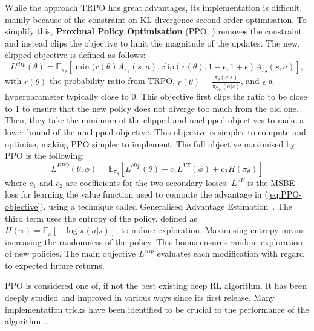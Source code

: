 While the approach TRPO has great advantages, its implementation is difficult, mainly because of the constraint on KL divergence second-order optimisation. To simplify this, \textbf{Proximal Policy Optimisation} (PPO; \cite{Schulman2017_PPO}) removes the constraint and instead clips the objective to limit the magnitude of the updates. The new, clipped objective is defined as follows:
\begin{equation}
    L^{clip}(\theta)=\mathbb{E}_{\pi_\theta}\left[\min(r(\theta)A_{\pi_\theta}(s,a),\text{clip}(r(\theta),1-\epsilon,1+\epsilon)A_{\pi_\theta}(s,a)\right],
    \label{eq:PPO-objective}
\end{equation}
with $r(\theta)$ the probability ratio from TRPO, $r(\theta)=\frac{\pi_\theta(a|s)}{\pi_{\theta_{old}}(a|s)}$, and $\epsilon$ a hyperparameter typically close to 0. This objective first clips the ratio to be close to 1 to ensure that the new policy does not diverge too much from the old one. Then, they take the minimum of the clipped and unclipped objectives to make a lower bound of the unclipped objective. This objective is simpler to compute and optimise, making PPO simpler to implement. The full objective maximised by PPO is the following:
\begin{equation}
    L^{PPO}(\theta,\phi)=\mathbb{E}_{\pi_\theta}\left[L^{clip}(\theta)-c_1L^{VF}(\phi)+c_2H(\pi_\theta)\right]
    \label{eq:PPOloss}
\end{equation}
where $c_1$ and $c_2$ are coefficients for the two secondary losses. $L^{VF}$ is the MSBE loss for learning the value function used to compute the advantage in (\ref{eq:PPO-objective}), using a technique called Generalised Advantage Estimation~\citep{Schulman2016_GAE}. The third term uses the entropy of the policy, defined as $H(\pi)=\mathbb{E}_\pi[-\log\pi(a|s)]$, to induce exploration. Maximising entropy means increasing the randomness of the policy. This bonus ensures random exploration of new policies. The main objective $L^{clip}$ evaluates each modification with regard to expected future returns. 

PPO is considered one of, if not the best existing deep RL algorithm. It has been deeply studied and improved in various ways since its first release. Many implementation tricks have been identified to be crucial to the performance of the algorithm~\citep{Hendersion2018_Matters, Engstrom2020_PPOImplement}. 



